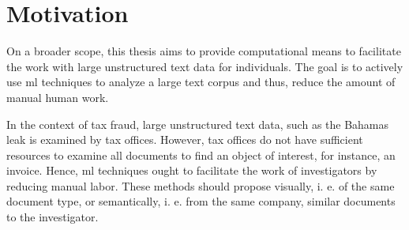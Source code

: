 \section{Motivation}\label{sec:motivation}

On a broader scope, this thesis aims to provide computational means to facilitate the work with large unstructured text data for individuals.
The goal is to actively use \ac{ml} techniques to analyze a large text corpus and thus, reduce the amount of manual human work.

In the context of tax fraud, large unstructured text data, such as the Bahamas leak is examined by tax offices.
However, tax offices do not have sufficient resources to examine all documents to find an object of interest, for instance, an invoice.
Hence, \ac{ml} techniques ought to facilitate the work of investigators by reducing manual labor.
These methods should propose visually, i. e. of the same document type, or semantically, i. e. from the same company, similar documents to the investigator.